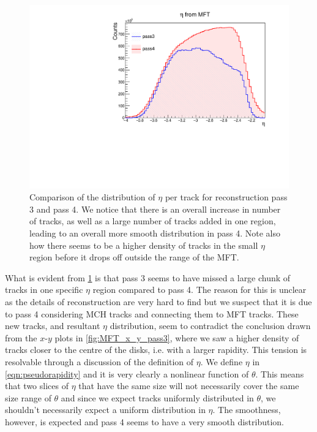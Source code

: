 \begin{figure}[H]
    \begin{center}
        \includegraphics[width=.8\textwidth]{Plots/pass3_pass4.pdf}
        \caption[Comparison of $\eta$ distributions of tracks from pass 3 and pass 4 in the MFT]{Comparison of the distribution of $\eta$ per track for reconstruction pass 3 and pass 4. We notice that there is an overall increase in number of tracks, as well as a large number of tracks added in one region, leading to an overall more smooth distribution in pass 4. Note also how there seems to be a higher density of tracks in the small $\eta$ region before it drops off outside the range of the MFT.}
        \label{fig:pass3_pass4_eta}
    \end{center}
\end{figure}

What is evident from \cref{fig:pass3_pass4_eta} is that pass 3 seems to have missed a large chunk of tracks in one specific $\eta$ region compared to pass 4. The reason for this is unclear as the details of reconstruction are very hard to find but we suspect that it is due to pass 4 considering MCH tracks and connecting them to MFT tracks. These new tracks, and resultant $\eta$ distribution, seem to contradict the conclusion drawn from the $x$-$y$ plots in \cref{fig:MFT_x_y_pass3}, where we saw a higher density of tracks closer to the centre of the disks, i.e. with a larger rapidity. This tension is resolvable through a discussion of the definition of $\eta$. We define $\eta$ in \cref{eqn:pseudorapidity} and it is very clearly a nonlinear function of $\theta$. This means that two slices of $\eta$ that have the same size will not necessarily cover the same size range of $\theta$ and since we expect tracks uniformly distributed in $\theta$, we shouldn't necessarily expect a uniform distribution in $\eta$. The smoothness, however, is expected and pass 4 seems to have a very smooth distribution.

